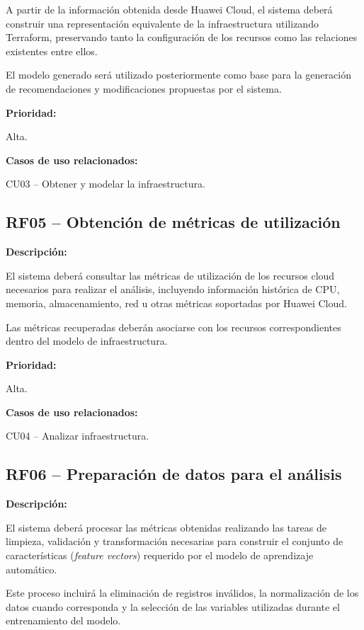 A partir de la información obtenida desde Huawei Cloud, el sistema deberá construir una representación equivalente de la infraestructura utilizando Terraform, preservando tanto la configuración de los recursos como las relaciones existentes entre ellos.

El modelo generado será utilizado posteriormente como base para la generación de recomendaciones y modificaciones propuestas por el sistema.

\noindent \textbf{Prioridad:}

Alta.

\noindent \textbf{Casos de uso relacionados:}

\noindent CU03 -- Obtener y modelar la infraestructura.

\subsection{RF05 -- Obtención de métricas de utilización}

\noindent \textbf{Descripción:}

El sistema deberá consultar las métricas de utilización de los recursos cloud necesarios para realizar el análisis, incluyendo información histórica de CPU, memoria, almacenamiento, red u otras métricas soportadas por Huawei Cloud.

Las métricas recuperadas deberán asociarse con los recursos correspondientes dentro del modelo de infraestructura.

\noindent \textbf{Prioridad:}

Alta.

\noindent \textbf{Casos de uso relacionados:}

\noindent CU04 -- Analizar infraestructura.

\subsection{RF06 -- Preparación de datos para el análisis}

\noindent \textbf{Descripción:}

El sistema deberá procesar las métricas obtenidas realizando las tareas de limpieza, validación y transformación necesarias para construir el conjunto de características (\emph{feature vectors}) requerido por el modelo de aprendizaje automático.

Este proceso incluirá la eliminación de registros inválidos, la normalización de los datos cuando corresponda y la selección de las variables utilizadas durante el entrenamiento del modelo.

